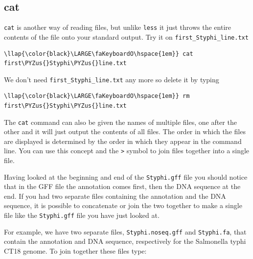 \documentclass[11pt]{article}
\def\PYZus{\char`\_}
\begin{document}
    \hypertarget{cat}{%
\subsection{cat}\label{cat}}

\texttt{cat} is another way of reading files, but unlike \texttt{less}
it just throws the entire contents of the file onto your standard
output. Try it on \texttt{first\_Styphi\_line.txt}

\begin{terminalinput}
\begin{Verbatim}[commandchars=\\\{\}]
\llap{\color{black}\LARGE\faKeyboardO\hspace{1em}} cat first\PYZus{}Styphi\PYZus{}line.txt
\end{Verbatim}
\end{terminalinput}

    We don't need \texttt{first\_Styphi\_line.txt} any more so delete it by
typing

\begin{terminalinput}
\begin{Verbatim}[commandchars=\\\{\}]
\llap{\color{black}\LARGE\faKeyboardO\hspace{1em}} rm first\PYZus{}Styphi\PYZus{}line.txt
\end{Verbatim}
\end{terminalinput}

    The \texttt{cat} command can also be given the names of multiple files,
one after the other and it will just output the contents of all files.
The order in which the files are displayed is determined by the order in
which they appear in the command line. You can use this concept and the
\texttt{\textgreater{}} symbol to join files together into a single
file.

Having looked at the beginning and end of the \texttt{Styphi.gff} file
you should notice that in the GFF file the annotation comes first, then
the DNA sequence at the end. If you had two separate files containing
the annotation and the DNA sequence, it is possible to concatenate or
join the two together to make a single file like the \texttt{Styphi.gff}
file you have just looked at.

For example, we have two separate files, \texttt{Styphi.noseq.gff} and
\texttt{Styphi.fa}, that contain the annotation and DNA sequence,
respectively for the Salmonella typhi CT18 genome. To join together
these files type:
\end{document}
